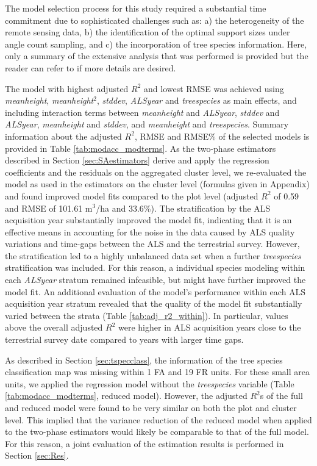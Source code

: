 \documentclass[remotesensing,article,submit,moreauthors,pdftex,10pt,a4paper]{mdpi}
\newcommand{\adjrsq}{adjusted $R^2$}
\newcommand{\mha}{m$^3$/ha}
\newcommand{\meanheight}{\textit{meanheight}}
\newcommand{\stddev}{\textit{stddev}}
\newcommand{\treespecies}{\textit{treespecies}}
\newcommand{\alsyear}{\textit{ALSyear}}
\begin{document}
The model selection process for this study required a substantial time commitment due to sophisticated challenges such as: a) the heterogeneity of the remote sensing data, b) the identification of the optimal support sizes under angle count sampling, and c) the incorporation of tree species information. Here, only a summary of the extensive analysis that was performed is provided but the reader can refer to \citet{hill2017a} if more details are desired.\par
The model with highest \adjrsq{} and lowest RMSE was achieved using \meanheight{}, \meanheight{}$^2$, \stddev{}, \alsyear{} and \treespecies{} as main effects, and including interaction terms between \meanheight{} and \alsyear{}, \stddev{} and \alsyear{}, \meanheight{} and \stddev{}, and \meanheight{} and \treespecies{}. Summary information about the \adjrsq{}, RMSE and RMSE\% of the selected models is provided in Table \ref{tab:modacc_modterms}. As the two-phase estimators described in Section \ref{sec:SAestimators} derive and apply the regression coefficients and the residuals on the aggregated cluster level, we re-evaluated the model as used in the estimators on the cluster level (formulas given in Appendix) and found improved model fits compared to the plot level (\adjrsq{} of 0.59 and RMSE of 101.61 \mha{} and 33.6\%). The stratification by the ALS acquisition year substantially improved the model fit, indicating that it is an effective means in accounting for the noise in the data caused by ALS quality variations and time-gaps between the ALS and the terrestrial survey. However, the stratification led to a highly unbalanced data set when a further \treespecies{} stratification was included. For this reason, a individual species modeling within each \alsyear{} stratum remained infeasible, but might have further improved the model fit. An additional evaluation of the model's performance within each ALS acquisition year stratum revealed that the quality of the model fit substantially varied between the strata (Table \ref{tab:adj_r2_within}). In particular, values above the overall \adjrsq{} were higher in ALS acquisition years close to the terrestrial survey date compared to years with larger time gaps.\par
As described in Section \ref{sec:tspecclass}, the information of the tree species classification map was missing within 1 FA and 19 FR units. For these small area units, we applied the regression model without the \treespecies{} variable (Table \ref{tab:modacc_modterms}, reduced model). However, the \adjrsq{}s of the full and reduced model were found to be very similar on both the plot and cluster level. This implied that the variance reduction of the reduced model when applied to the two-phase estimators would likely be comparable to that of the full model. For this reason, a joint evaluation of the estimation results is performed in Section \ref{sec:Res}.
\end{document}
